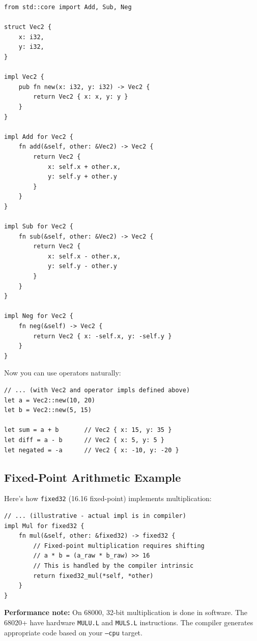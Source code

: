 \begin{lstlisting}
from std::core import Add, Sub, Neg

struct Vec2 {
    x: i32,
    y: i32,
}

impl Vec2 {
    pub fn new(x: i32, y: i32) -> Vec2 {
        return Vec2 { x: x, y: y }
    }
}

impl Add for Vec2 {
    fn add(&self, other: &Vec2) -> Vec2 {
        return Vec2 {
            x: self.x + other.x,
            y: self.y + other.y
        }
    }
}

impl Sub for Vec2 {
    fn sub(&self, other: &Vec2) -> Vec2 {
        return Vec2 {
            x: self.x - other.x,
            y: self.y - other.y
        }
    }
}

impl Neg for Vec2 {
    fn neg(&self) -> Vec2 {
        return Vec2 { x: -self.x, y: -self.y }
    }
}
\end{lstlisting}

Now you can use operators naturally:

\begin{lstlisting}
// ... (with Vec2 and operator impls defined above)
let a = Vec2::new(10, 20)
let b = Vec2::new(5, 15)

let sum = a + b       // Vec2 { x: 15, y: 35 }
let diff = a - b      // Vec2 { x: 5, y: 5 }
let negated = -a      // Vec2 { x: -10, y: -20 }
\end{lstlisting}

\subsection{Fixed-Point Arithmetic Example}

Here's how \texttt{fixed32} (16.16 fixed-point) implements multiplication:

\begin{lstlisting}
// ... (illustrative - actual impl is in compiler)
impl Mul for fixed32 {
    fn mul(&self, other: &fixed32) -> fixed32 {
        // Fixed-point multiplication requires shifting
        // a * b = (a_raw * b_raw) >> 16
        // This is handled by the compiler intrinsic
        return fixed32_mul(*self, *other)
    }
}
\end{lstlisting}

\textbf{Performance note:} On 68000, 32-bit multiplication is done in software. The 68020+ have hardware \texttt{MULU.L} and \texttt{MULS.L} instructions. The compiler generates appropriate code based on your \texttt{--cpu} target.

